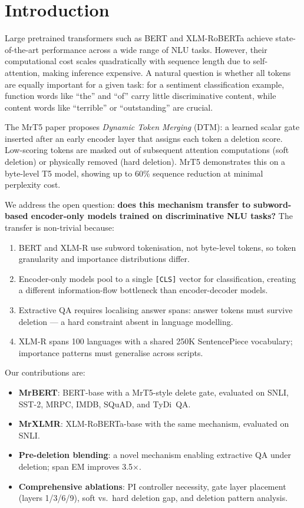 \documentclass[11pt,a4paper]{article}
\begin{document}
\section{Introduction}
\label{sec:introduction}

Large pretrained transformers such as BERT \citep{devlin2019bert} and XLM-RoBERTa \citep{conneau2020xlmr} achieve state-of-the-art performance across a wide range of NLU tasks. However, their computational cost scales quadratically with sequence length due to self-attention, making inference expensive. A natural question is whether all tokens are equally important for a given task: for a sentiment classification example, function words like ``the'' and ``of'' carry little discriminative content, while content words like ``terrible'' or ``outstanding'' are crucial.

The MrT5 paper \citep{kallini2024mrt5} proposes \emph{Dynamic Token Merging} (DTM): a learned scalar gate inserted after an early encoder layer that assigns each token a deletion score. Low-scoring tokens are masked out of subsequent attention computations (soft deletion) or physically removed (hard deletion). MrT5 demonstrates this on a byte-level T5 model, showing up to 60\% sequence reduction at minimal perplexity cost.

We address the open question: \textbf{does this mechanism transfer to subword-based encoder-only models trained on discriminative NLU tasks?} The transfer is non-trivial because:

\begin{enumerate}[nosep]
    \item BERT and XLM-R use subword tokenisation, not byte-level tokens, so token granularity and importance distributions differ.
    \item Encoder-only models pool to a single \texttt{[CLS]} vector for classification, creating a different information-flow bottleneck than encoder-decoder models.
    \item Extractive QA requires localising answer spans: answer tokens must survive deletion --- a hard constraint absent in language modelling.
    \item XLM-R spans 100 languages with a shared 250K SentencePiece vocabulary; importance patterns must generalise across scripts.
\end{enumerate}

Our contributions are:
\begin{itemize}[nosep]
    \item \textbf{MrBERT}: BERT-base with a MrT5-style delete gate, evaluated on SNLI, SST-2, MRPC, IMDB, SQuAD, and TyDi~QA.
    \item \textbf{MrXLMR}: XLM-RoBERTa-base with the same mechanism, evaluated on SNLI.
    \item \textbf{Pre-deletion blending}: a novel mechanism enabling extractive QA under deletion; span EM improves 3.5$\times$.
    \item \textbf{Comprehensive ablations}: PI controller necessity, gate layer placement (layers 1/3/6/9), soft vs.\ hard deletion gap, and deletion pattern analysis.
\end{itemize}
\end{document}
